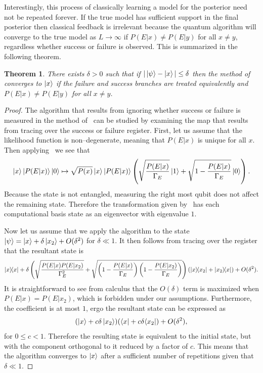 \documentclass[aps,amsmath,onecolumn,amssymb]{revtex4}
\newtheorem{theorem}{Theorem}
\begin{document}
Interestingly, this process of classically learning a model for the posterior need not be repeated forever.  If the true model has sufficient support in the final posterior then classical feedback is irrelevant because the quantum algorithm will converge to the true model as $L\rightarrow \infty$ if $P(E|x) \ne P(E|y)$ for all $x\ne y$, regardless whether success or failure is observed.  This is summarized in the following theorem.
\begin{theorem}
There exists $\delta>0$ such that if $|\left|\psi\right\rangle - \left|x\right\rangle| \le \delta$ then the method of~ converges to $\left|x\right\rangle$ if the failure and success branches are treated equivalently and $P(E|x) \ne P(E|y)$ for all $x\ne y$.
\end{theorem}
\begin{proof}
The algorithm that results from ignoring whether success or failure is measured in the method of~ can be studied by examining the map that results from tracing over the success or failure register.
First, let us assume that the likelihood function is non--degenerate, meaning that $P(E|x)$ is unique for all $x$.  Then applying~ we see that
\begin{equation}
\left|x\right\rangle \left|P(E|x)\right\rangle\left|0\right\rangle\mapsto \sqrt{P(x)} \left|x\right\rangle \left|P(E|x)\right\rangle\left(\sqrt{\frac{P(E|x)}{\Gamma_E}}\left|1\right\rangle + \sqrt{1-\frac{P(E|x)}{\Gamma_E}}\left|0\right\rangle \right).
\end{equation}
Because the state is not entangled, measuring the right most qubit does not affect the remaining state.  Therefore the transformation given by~ has each computational basis state as an eigenvector with eigenvalue $1$.

Now let us assume that we apply the algorithm to the state $\left|\psi\right\rangle = \left|x\right\rangle +\delta \left|x_2\right\rangle + O(\delta^2)$ for $\delta\ll 1$.  It then follows from tracing over the register that the resultant state is
\begin{equation}
|x\rangle\!\langle x| + \delta\left(\sqrt{\frac{P(E|x)P(E|x_2)}{\Gamma_E^2}} + \sqrt{\left(1-\frac{P(E|x)}{\Gamma_E}\right)\left(1-\frac{P(E|x_2)}{\Gamma_E}\right)} \right)(|x\rangle\!\langle x_2|+|x_2\rangle\!\langle x|) + O(\delta^2).
\end{equation}
It is straightforward to see from calculus that the $O(\delta)$ term is maximized when $P(E|x)=P(E|x_2)$, which is forbidden under our assumptions.  Furthermore, the coefficient is at most $1$, ergo the resultant state can be expressed as
\begin{equation}
(\left|x\right\rangle + c\delta \left|x_2\right\rangle)(\langle x| + c\delta \langle x_2|) + O(\delta^2),
\end{equation}
for $0\le c<1$.  Therefore the resulting state is equivalent to the initial state, but with the component orthogonal to it reduced by a factor of $c$.  This means that the algorithm converges to $\left|x\right\rangle$ after a sufficient number of repetitions given that $\delta\ll 1$.


\end{proof}
\end{document}
